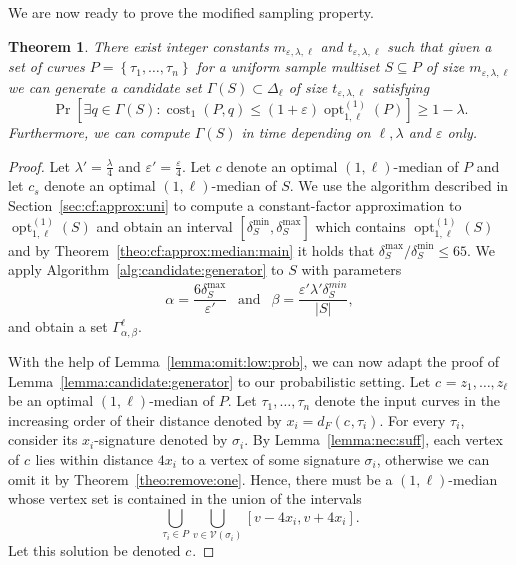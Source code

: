 \documentclass[11pt, letter]{article}
\DeclareMathOperator{\cost}{cost}
\DeclareMathOperator{\opt}{opt}
\newtheorem{theorem}{Theorem}[section]
\newcommand{\secref}[1]{Section~\ref{sec:#1}}
\newcommand{\thmlab}[1]{{\label{theo:#1}}}
\newcommand{\thmref}[1]{Theorem~\ref{theo:#1}}
\newcommand{\lemref}[1]{Lemma~\ref{lemma:#1}}
\newcommand{\algref}[1]{Algorithm~\ref{alg:#1}}
\providecommand{\eps}{{\varepsilon}}\newcommand{\Astop}{\overline{a}}
\providecommand{\pth}[2][\!]{#1\left({#2}\right)}
\providecommand{\brc}[1]{\left\{ {#1} \right\}}
\newcommand{\lenClusters}{\ensuremath{\ell}}
\newcommand{\trajectory}[2]{\ensuremath{{#1}_{#2}}}
\newcommand{\inputSym}{\ensuremath{\tau}}
\newcommand{\centerSym}{\ensuremath{c}}
\newcommand{\inputTraj}[1]{\trajectory{\inputSym}{#1}}
\newcommand{\centerTraj}[1]{\trajectory{\centerSym}{#1}}
\newcommand{\VtxSet}{\ensuremath{\mathcal{V}}}
\newcommand{\distFr}[2]{\ensuremath{d_F\pth{#1,#2}}}
\begin{document}
We are now ready to prove the modified sampling property.
\begin{theorem}\thmlab{modified:sampling:prop}
There exist  integer constants $m_{\eps,\lambda,\lenClusters}$ and
$t_{\eps,\lambda,\lenClusters}$ such that given a set of curves
$P=\brc{\inputTraj{1},\dots,\inputTraj{n}}$  for a uniform
sample multiset $S\subseteq P$ of size $m_{\eps,\lambda,\lenClusters}$
we can generate a candidate set $\Gamma(S) \subset \Delta_{\lenClusters}$ of size $t_{\eps,\lambda,\lenClusters}$ satisfying
\[\Pr\left[ \exists q \in \Gamma(S): \cost_{1}(P,q) \leq (1+\eps)\opt^{(1)}_{1,\lenClusters}(P) \right] \geq 1-\lambda.\] 
Furthermore, we can compute $\Gamma(S)$ in time depending on $\lenClusters,\lambda$ and $\eps$ only.
\end{theorem}

\begin{proof}
Let $\lambda'=\frac{\lambda}{4}$ and $\eps'=\frac{\eps}{4}$.
Let $c$ denote an optimal $(1,\ell)$-median of $P$ and let $c_s$ denote an optimal $(1,\ell)$-median of $S$.  
We use the algorithm described in \secref{cf:approx:uni} to compute a
constant-factor approximation to $\opt^{(1)}_{1,\lenClusters}(S) $ and obtain an interval 
$[\delta_S^{\min}, \delta_S^{\max}]$ which contains
$\opt^{(1)}_{1,\lenClusters}(S)$ and by \thmref{cf:approx:median:main} it holds
that $\delta_S^{\max}/\delta_S^{\min} \leq 65$.
We apply \algref{candidate:generator} to $S$ with parameters
\[ \alpha = \frac{6\delta_S^{\max}}{\eps'} ~~ \text{ and } ~~
\beta = \frac{\eps'\lambda' \delta_S^{min}}{|S|},
\]
and obtain a set $\Gamma^{\lenClusters}_{\alpha,\beta}$.

With the help of \lemref{omit:low:prob}, we can now adapt the proof of 
\lemref{candidate:generator} to our probabilistic setting.
Let $\centerTraj{}=z_1,\dots,z_{\lenClusters}$ be an optimal 
$(1,\ell)$-median of $P$.
Let $\inputTraj{1},\dots,\inputTraj{n}$ denote the input curves in the increasing order of their
distance denoted by $x_i=\distFr{\centerTraj{}}{\inputTraj{i}}$. For every $\inputTraj{i}$,
consider its $x_i$-signature denoted by $\sigma_i$.   
By \lemref{nec:suff}, each vertex of
$\centerTraj{}$ lies within distance $4x_i$ to a vertex of some signature
$\sigma_i$, otherwise we can omit it by \thmref{remove:one}.  Hence, there must
be a $(1,\lenClusters)$-median whose vertex set is contained in the union of
the intervals 
\[ \bigcup_{\inputTraj{i} \in P} \bigcup_{v \in \VtxSet(\sigma_i) }  [v-4x_i,v+4x_i].\] 
Let this solution be denoted $\centerTraj{}$. 



\end{proof}
\end{document}
